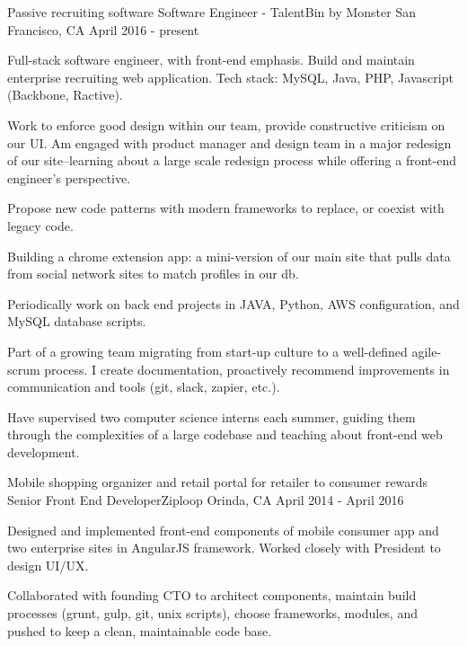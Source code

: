 \begin{cventries}
  \cventry
    {Passive recruiting software}
    {Software Engineer - TalentBin by Monster}    
    {San Francisco, CA}
    {April 2016 - present}
    {
      \begin{cvitems}
        \item {Full-stack software engineer, with front-end emphasis. Build and maintain enterprise recruiting web application. Tech stack: MySQL, Java, PHP, Javascript (Backbone, Ractive).}
        \item {Work to enforce good design within our team, provide constructive criticism on our UI. Am engaged with product manager and design team in a major redesign of our site--learning about a large scale redesign process while offering a front-end engineer's perspective.}
        \item {Propose new code patterns with modern frameworks to replace, or coexist with legacy code.}
        \item {Building a chrome extension app: a mini-version of our main site that pulls data from social network sites to match profiles in our db.}
        \item {Periodically work on back end projects in JAVA, Python, AWS configuration, and MySQL database scripts.}
        \item {Part of a growing team migrating from start-up culture to a well-defined agile-scrum process. I create documentation, proactively recommend improvements in communication and tools (git, slack, zapier, etc.).}
        \item {Have supervised two computer science interns each summer, guiding them through the complexities of a large codebase and teaching about front-end web development.}
      \end{cvitems}
    }
  \cventry
    {Mobile shopping organizer and retail portal for retailer to consumer rewards}
    {Senior Front End Developer{\enskip\cdotp\enskip}Ziploop }
    {Orinda, CA}
    {April 2014 - April 2016}
    {
      \begin{cvitems}
        \item {Designed and implemented front-end components of mobile consumer app and two enterprise sites in AngularJS framework. Worked closely with President to design UI/UX.}
        \item {Collaborated with founding CTO to architect components, maintain build processes (grunt, gulp, git, unix scripts), choose frameworks, modules, and pushed to keep a clean, maintainable code base.}

\end{cvitems}}
\end{cventries}
